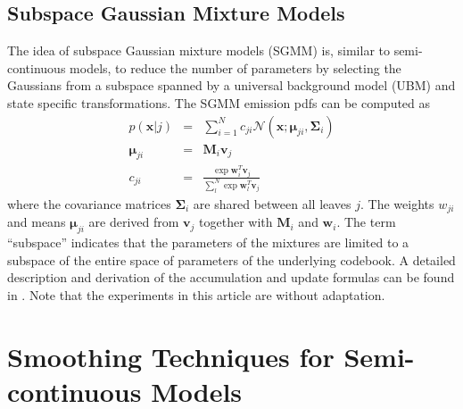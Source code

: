 \documentclass{article}
\def \x{{\mathbf x}}
\def \v{{\mathbf v}}
\def \w{{\mathbf w}}
\def \M{{\mathbf M}}
\def \m{{\bm \mu}}
\def \k{{\mathbf \Sigma}}
\def \nv{{\mathcal N}}
\begin{document}
\subsection{Subspace Gaussian Mixture Models}
The idea of subspace Gaussian mixture models (SGMM) is, similar to 
semi-continuous models, to reduce the number of parameters by selecting the
Gaussians from a subspace spanned by a universal background model (UBM)
and state specific transformations.   The SGMM emission pdfs can
be computed as
\begin{eqnarray}
p(\x | j) & = & \sum_{i=1}^{N} c_{ji} \nv(\x; \m_{ji}, \k_i) \\
\m_{ji}    & = & \M_i \v_j \\
c_{ji}     & = & \frac{\exp \w_i^T \v_j}{\sum_l^N \exp \w_l^T \v_j}
\end{eqnarray}
where the covariance matrices $\k_i$ are shared between all leaves $j$. The
weights $w_{ji}$ and means $\m_{ji}$ are derived from $\v_j$ together with
$\M_i$ and $\w_i$. The term ``subspace'' indicates that the parameters of the
mixtures are limited to a subspace of the entire space of parameters of
the underlying codebook.
%
A detailed description and derivation of the accumulation and update formulas
can be found in \cite{povey2011sgm}. Note that the experiments in this article
are without adaptation.

\section{Smoothing Techniques for Semi-continuous Models}
\label{sec:smooth}
%
\end{document}
